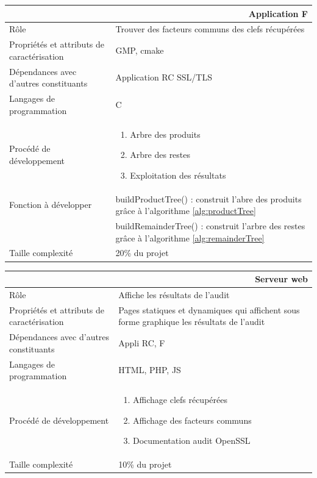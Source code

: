 \documentclass[a4paper,11pt,french]{article}
\begin{document}
\begin{center}
	\vspace*{0.7cm}
	\begin{tabularx}{16cm}{|l|X|}
	\hline
	\multicolumn{2}{|r|}{\textbf{Application F}}\\
	\hline
	R\^ole & Trouver des facteurs communs des clefs récupérées\\
	\hline
	Propriétés et attributs de caractérisation & GMP, cmake\\
	\hline
	Dépendances avec d'autres constituants & Application RC SSL/TLS\\
	\hline
	Langages de programmation & C\\
	\hline
	Procédé de développement & \begin{enumerate} \item Arbre des produits \item Arbre des restes \item Exploitation des résultats \end{enumerate}\\
	\hline
	Fonction à développer & buildProductTree() : construit l'abre des produits grâce à l'algorithme \ref{alg:productTree}\\
	& buildRemainderTree() : construit l'arbre des restes grâce à l'algorithme \ref{alg:remainderTree}\\
	\hline
	Taille complexité & 20\% du projet\\
	\hline
	\end{tabularx}
\end{center}

\begin{center}
	\vspace*{0.7cm}
	\begin{tabularx}{16cm}{|l|X|}
	\hline
	\multicolumn{2}{|r|}{\textbf{Serveur web}}\\
	\hline
	R\^ole & Affiche les résultats de l'audit \\
	\hline
	Propriétés et attributs de caractérisation & Pages statiques et dynamiques qui affichent sous forme graphique les résultats de l'audit \\
	\hline
	Dépendances avec d'autres constituants & Appli RC, F \\
	\hline
	Langages de programmation & HTML, PHP, JS\\
	\hline
	Procédé de développement & \begin{enumerate} \item Affichage clefs récupérées \item Affichage des facteurs communs \item Documentation audit OpenSSL\end{enumerate}\\
	\hline
	Taille complexité & 10\% du projet\\
	\hline
	\end{tabularx}
\end{center}
\end{document}
